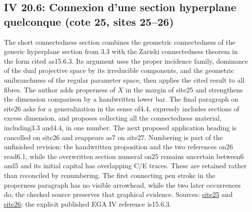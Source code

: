 \subsection*{IV 20.6: Connexion d'une section hyperplane quelconque (cote 25, sites 25--26)}
The short connectedness section combines the geometric connectedness of the generic hyperplane section from 3.3 with the Zariski connectedness theorem in the form cited as15.6.3. Its argument uses the proper incidence family, dominance of the dual projective space by its irreducible components, and the geometric unibranchness of the regular parameter space, then applies the cited result to all fibres. The author adds properness of $X$ in the margin of site25 and strengthens the dimension comparison by a handwritten lower bar. The final paragraph on site26 asks for a generalization in the sense of4.4, expressly includes sections of excess dimension, and proposes collecting all the connectedness material, including3.3 and4.4, in one number. The next proposed application heading is cancelled on site26 and reappears as7 on site27. Numbering is part of the unfinished revision: the handwritten proposition and the two references on26 read6.1, while the overwritten section numeral on25 remains uncertain between6 and5 and its initial capital has overlapping C/E traces. These are retained rather than reconciled by renumbering. The first connecting pen stroke in the properness paragraph has no visible arrowhead, while the two later occurrences do; the checked source preserves that graphical evidence. Sources: \href{https://grothendieck.umontpellier.fr/web/viewer.html?file=../25.pdf\#page=26}{site25} and \href{https://grothendieck.umontpellier.fr/web/viewer.html?file=../25.pdf\#page=27}{site26}; the explicit published EGA IV reference is15.6.3.
